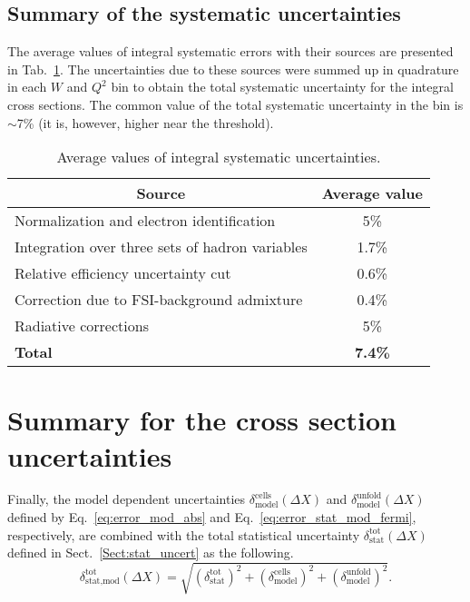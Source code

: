 \subsection*{Summary of the systematic uncertainties}

The average values of integral systematic errors with their sources are presented in Tab.~\ref{tab:sys_err}. The uncertainties due to these sources were summed up in quadrature in each $W$ and $Q^{2}$ bin to obtain the total systematic uncertainty for the integral cross sections. The common value of the total systematic uncertainty in the bin is $\sim$7\% (it is, however, higher near the threshold).

\begin{table}[htp]
\begin{center}
\caption{\small Average values of integral systematic uncertainties. \label{tab:sys_err}}
\begin{tabular}{|l|c|}

\hline
\multicolumn{1}{|c|}{Source} & Average value \\ \hline
Normalization and electron identification & 5\% \\ \hline
Integration over three sets of hadron variables & 1.7\%\\ \hline 
Relative efficiency uncertainty cut & 0.6\%\\ \hline 
Correction due to FSI-background admixture & 0.4\%\\ \hline 
Radiative corrections & 5\% \\ \hline 
\bf{Total} & \bf{7.4}\% \\ \hline 
\end{tabular}
\end{center}
\end{table} 



\section{Summary for the cross section uncertainties}
\label{Sect:uncert_resume}


Finally, the model dependent uncertainties $\delta^{\text{cells}}_{\text{model}}(\Delta X)$ and $\delta^{\text{unfold}}_{\text{model}}(\Delta X)$ defined by Eq.~\eqref{eq:error_mod_abs} and Eq.~\eqref{eq:error_stat_mod_fermi}, respectively, are combined with the total statistical uncertainty $\delta_{\text{stat}}^{\text{tot}}(\Delta X)$ defined in Sect.~\ref{Sect:stat_uncert} as the following.
\begin{equation}
\delta_{\text{stat,mod}}^{\text{tot}} (\Delta X) =
\sqrt{\left (\delta_{\text{stat}}^{\text{tot}} \right )^{2} + \left (\delta^{\text{cells}}_{\text{model}}\right )^{2} + \left (\delta^{\text{unfold}}_{\text{model}}\right )^{2}}.
\label{eq:error_stat_mod}
\end{equation}


